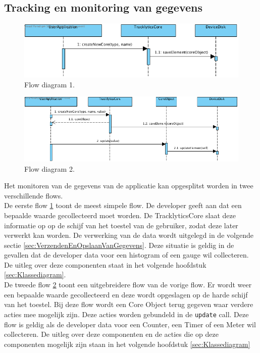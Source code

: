 \subsection{Tracking en monitoring van gegevens}\label{sec:TrackingEnMonitoringVanGegevens}
\begin{figure}[!h]
  \centering
  \includegraphics[scale=0.4]{Afbeeldingen/Architectuur/FlowDiagram1}
  \caption{Flow diagram 1.}
  \label{fig:flow1}
\end{figure}
\begin{figure}[!h]
  \centering
  \includegraphics[scale=0.4]{Afbeeldingen/Architectuur/FlowDiagram2}
  \caption{Flow diagram 2.}
  \label{fig:flow2}
\end{figure}

Het monitoren van de gegevens van de applicatie kan opgesplitst worden in twee verschillende flows. \\

De eerste flow \ref{fig:flow1} toont de meest simpele flow. De developer geeft aan dat een bepaalde waarde gecollecteerd moet worden. De TracklyticsCore slaat deze informatie op op de schijf van het toestel van de gebruiker, zodat deze later verwerkt kan worden. De verwerking van de data wordt uitgelegd in de volgende sectie \ref{sec:VerzendenEnOpslaanVanGegevens}. Deze situatie is geldig in de gevallen dat de developer data voor een histogram of een gauge wil collecteren. De uitleg over deze componenten staat in het volgende hoofdstuk \ref{sec:Klassediagram}.\\

De tweede flow \ref{fig:flow2} toont een uitgebreidere flow van de vorige flow. Er wordt weer een bepaalde waarde gecollecteerd en deze wordt opgeslagen op de harde schijf van het toestel. Bij deze flow wordt een Core Object terug gegeven waar verdere acties mee mogelijk zijn. Deze acties worden gebundeld in de \texttt{update} call. Deze flow is geldig als de developer data voor een Counter, een Timer of een Meter wil collecteren. De uitleg over deze componenten en de acties die op deze componenten mogelijk zijn staan in het volgende hoofdstuk \ref{sec:Klassediagram} \\


